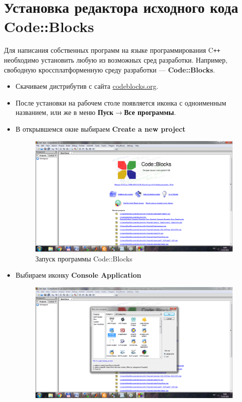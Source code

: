 \chapter{Установка редактора исходного кода Code::Blocks}
Для написания собственных программ на языке программирования C\texttt{++} необходимо установить любую из возможных сред разработки. Например, свободную кроссплатформенную среду разработки --- \textbf{Code::Blocks}.
\begin{itemize}
    \item Скачиваем дистрибутив с сайта {\color{Blue}\href{https://www.codeblocks.org/downloads/binaries/#imagesoswindows48pnglogo-microsoft-windows}{codeblocks.org}}.
    \item После установки на рабочем столе появляется иконка с одноименным названием, или же в меню \textbf{Пуск$\rightarrow$Все программы}.
    \item В открывшемся окне выбираем \textbf{Create a new project}
    \begin{figure}[H]
        \centering
        \includegraphics[width=.9\linewidth]{figures/CodeBlocks-1.png}
        \caption{Запуск программы Code::Blocks}
        \label{CodeBlocks-1}
    \end{figure}
    \item Выбираем иконку \textbf{Console Application}
    \begin{figure}[H]
        \centering
        \includegraphics[width=.9\linewidth]{figures/CodeBlocks-2.png}

\end{figure}
\end{itemize}
